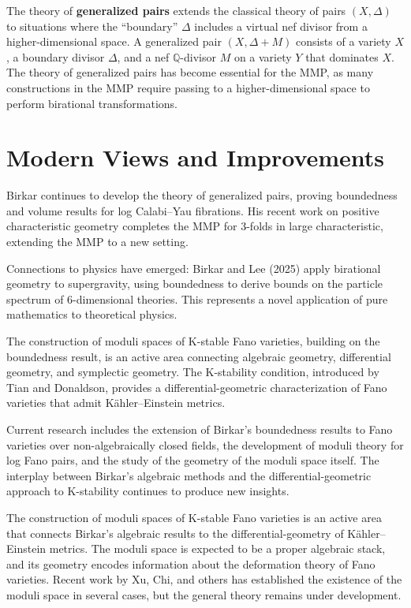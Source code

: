 The theory of \textbf{generalized pairs} extends the classical theory of pairs $(X, \Delta)$ to situations where the ``boundary'' $\Delta$ includes a virtual nef divisor from a higher-dimensional space. A generalized pair $(X, \Delta + M)$ consists of a variety $X$, a boundary divisor $\Delta$, and a nef $\mathbb{Q}$-divisor $M$ on a variety $Y$ that dominates $X$. The theory of generalized pairs has become essential for the MMP, as many constructions in the MMP require passing to a higher-dimensional space to perform birational transformations.

\section{Modern Views and Improvements}

Birkar continues to develop the theory of generalized pairs, proving boundedness and volume results for log Calabi--Yau fibrations. His recent work on positive characteristic geometry completes the MMP for 3-folds in large characteristic, extending the MMP to a new setting.

Connections to physics have emerged: Birkar and Lee (2025) apply birational geometry to supergravity, using boundedness to derive bounds on the particle spectrum of 6-dimensional theories. This represents a novel application of pure mathematics to theoretical physics.

The construction of moduli spaces of K-stable Fano varieties, building on the boundedness result, is an active area connecting algebraic geometry, differential geometry, and symplectic geometry. The K-stability condition, introduced by Tian and Donaldson, provides a differential-geometric characterization of Fano varieties that admit K\"ahler--Einstein metrics.

Current research includes the extension of Birkar's boundedness results to Fano varieties over non-algebraically closed fields, the development of moduli theory for log Fano pairs, and the study of the geometry of the moduli space itself. The interplay between Birkar's algebraic methods and the differential-geometric approach to K-stability continues to produce new insights.

The construction of moduli spaces of K-stable Fano varieties is an active area that connects Birkar's algebraic results to the differential-geometry of K\"ahler--Einstein metrics. The moduli space is expected to be a proper algebraic stack, and its geometry encodes information about the deformation theory of Fano varieties. Recent work by Xu, Chi, and others has established the existence of the moduli space in several cases, but the general theory remains under development.

